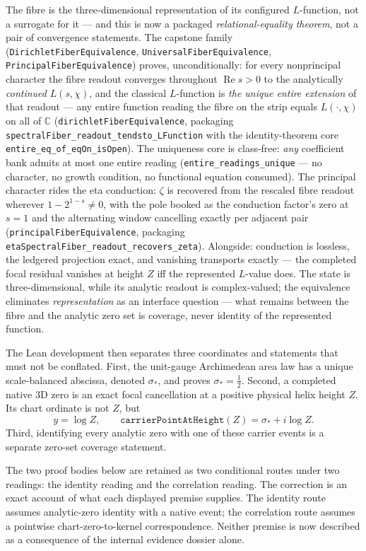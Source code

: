 \documentclass[11pt]{article}
\theoremstyle{definition}
\renewcommand{\Re}{\operatorname{Re}}
\begin{document}
The fibre is the three-dimensional representation of its configured
$L$-function, not a surrogate for it --- and this is now a packaged
\emph{relational-equality theorem}, not a pair of convergence statements.
The capstone family
(\texttt{DirichletFiberEquivalence}, \texttt{UniversalFiberEquivalence},
\texttt{PrincipalFiberEquivalence}) proves, unconditionally: for every
nonprincipal character the fibre readout converges throughout $\Re s>0$ to
the analytically \emph{continued} $L(s,\chi)$, and the classical
$L$-function is \emph{the unique entire extension} of that readout --- any
entire function reading the fibre on the strip equals $L(\cdot,\chi)$ on all
of $\mathbb C$ (\texttt{dirichletFiberEquivalence}, packaging
\texttt{spectralFiber\_readout\_tendsto\_LFunction} with the
identity-theorem core \texttt{entire\_eq\_of\_eqOn\_isOpen}).  The
uniqueness core is class-free: \emph{any} coefficient bank admits at most
one entire reading (\texttt{entire\_readings\_unique} --- no character, no
growth condition, no functional equation consumed).  The principal character
rides the eta conduction: $\zeta$ is recovered from the rescaled fibre
readout wherever $1-2^{1-s}\neq0$, with the pole booked as the conduction
factor's zero at $s=1$ and the alternating window cancelling exactly per
adjacent pair (\texttt{principalFiberEquivalence}, packaging
\texttt{etaSpectralFiber\_readout\_recovers\_zeta}).  Alongside: conduction
is lossless, the ledgered projection exact, and vanishing transports exactly
--- the completed focal residual vanishes at height $Z$ iff the represented
$L$-value does.  The state is three-dimensional, while its analytic readout
is complex-valued; the equivalence eliminates \emph{representation} as an
interface question --- what remains between the fibre and the analytic zero
set is coverage, never identity of the represented function.

The Lean development then separates three coordinates and statements that
must not be conflated.  First, the unit-gauge Archimedean area law has a unique
scale-balanced abscissa, denoted \(\sigma_*\), and proves
\(\sigma_*=\tfrac12\).  Second, a completed native 3D zero is an exact focal
cancellation at a positive physical helix height $Z$.  Its chart ordinate is
not $Z$, but
\[
 y=\log Z,
 \qquad
 \texttt{carrierPointAtHeight}(Z)=\sigma_*+i\log Z.
\]
Third, identifying every analytic zero with one of these carrier events is a
separate zero-set coverage statement.

The two proof bodies below are retained as two conditional routes under two
readings: the identity reading and the correlation reading.  The correction is
an exact account of what each displayed premise supplies.  The identity route
assumes analytic-zero identity with a native event; the correlation route
assumes a pointwise chart-zero-to-kernel correspondence.  Neither premise is
now described as a consequence of the internal evidence dossier alone.
\end{document}
